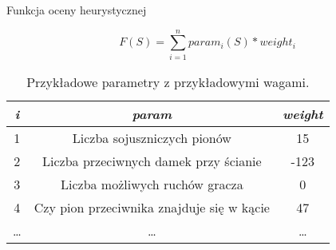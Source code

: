 \begin{frame}{Funkcja oceny heurystycznej}

	\[ F(S) = \sum_{i=1}^{n} param_i(S) * weight_i \]

	\begin{table}[h]
		\centering
		{\small
		\begin{tabular}{|c|c|c|}
		\hline
			\textit{i} & \textit{param} & \textit{weight} \\ 
		\hline
			1 & Liczba sojuszniczych pionów & 15\\ 
		\hline
			2 & Liczba przeciwnych damek przy ścianie & -123\\ 
		\hline
			3 & Liczba możliwych ruchów gracza & 0 \\
		\hline
			4 & Czy pion przeciwnika znajduje się w kącie & 47 \\
		\hline
			\ldots & \ldots & \ldots \\
		\hline
		\end{tabular}
		}
		\caption{Przykładowe parametry z przykładowymi wagami.}
	\end{table}

\end{frame}


